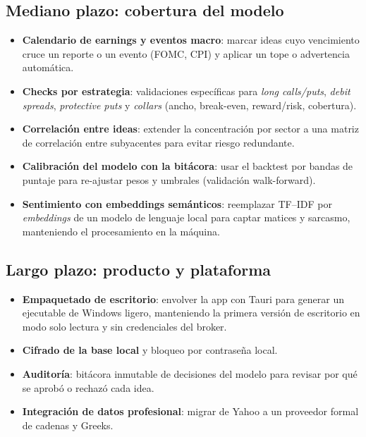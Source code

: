 \documentclass[11pt,letterpaper]{article}
\begin{document}
\subsection{Mediano plazo: cobertura del modelo}

\begin{itemize}[noitemsep]
  \item \textbf{Calendario de earnings y eventos macro}: marcar ideas cuyo
        vencimiento cruce un reporte o un evento (FOMC, CPI) y aplicar un tope o
        advertencia automática.
  \item \textbf{Checks por estrategia}: validaciones específicas para
        \emph{long calls/puts}, \emph{debit spreads}, \emph{protective puts} y
        \emph{collars} (ancho, break-even, reward/risk, cobertura).
  \item \textbf{Correlación entre ideas}: extender la concentración por sector a
        una matriz de correlación entre subyacentes para evitar riesgo redundante.
  \item \textbf{Calibración del modelo con la bitácora}: usar el backtest por
        bandas de puntaje para re-ajustar pesos y umbrales (validación walk-forward).
  \item \textbf{Sentimiento con embeddings semánticos}: reemplazar TF--IDF por
        \emph{embeddings} de un modelo de lenguaje local para captar matices y
        sarcasmo, manteniendo el procesamiento en la máquina.
\end{itemize}

\subsection{Largo plazo: producto y plataforma}

\begin{itemize}[noitemsep]
  \item \textbf{Empaquetado de escritorio}: envolver la app con Tauri para generar
        un ejecutable de Windows ligero, manteniendo la primera versión de
        escritorio en modo solo lectura y sin credenciales del broker.
  \item \textbf{Cifrado de la base local} y bloqueo por contraseña local.
  \item \textbf{Auditoría}: bitácora inmutable de decisiones del modelo para
        revisar por qué se aprobó o rechazó cada idea.
  \item \textbf{Integración de datos profesional}: migrar de Yahoo a un proveedor
        formal de cadenas y Greeks.
\end{itemize}
\end{document}
